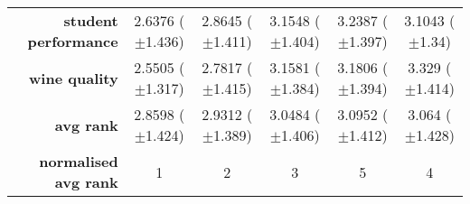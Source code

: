 \begin{table}[htbp]
{\begin{tabular}{r|ccccc}
			\textbf{student performance} & \cellcolor[rgb]{ .388,  .745,  .482}2.6376 ($\pm$1.436) & \cellcolor[rgb]{ .682,  .827,  .498}2.8645 ($\pm$1.411) & \cellcolor[rgb]{ .992,  .733,  .482}3.1548 ($\pm$1.404) & \cellcolor[rgb]{ .973,  .412,  .42}3.2387 ($\pm$1.397)  & \cellcolor[rgb]{ 1,  .922,  .518}3.1043 ($\pm$1.34)     \\
			\textbf{wine quality}        & \cellcolor[rgb]{ .388,  .745,  .482}2.5505 ($\pm$1.317) & \cellcolor[rgb]{ .62,  .812,  .494}2.7817 ($\pm$1.415)  & \cellcolor[rgb]{ 1,  .922,  .518}3.1581 ($\pm$1.384)    & \cellcolor[rgb]{ 1,  .855,  .506}3.1806 ($\pm$1.394)    & \cellcolor[rgb]{ .973,  .412,  .42}3.329 ($\pm$1.414)   \\
			\midrule
			\textbf{avg rank}            & \cellcolor[rgb]{ .388,  .745,  .482}2.8598 ($\pm$1.424) & \cellcolor[rgb]{ .62,  .812,  .494}2.9312 ($\pm$1.389)  & \cellcolor[rgb]{ 1,  .922,  .518}3.0484 ($\pm$1.406)    & \cellcolor[rgb]{ .973,  .412,  .42}3.0952 ($\pm$1.412)  & \cellcolor[rgb]{ .992,  .753,  .486}3.064 ($\pm$1.428)  \\
			\midrule
			\textbf{normalised avg rank} & \cellcolor[rgb]{ .388,  .745,  .482}1                   & \cellcolor[rgb]{ .694,  .831,  .498}2                   & \cellcolor[rgb]{ 1,  .922,  .518}3                      & \cellcolor[rgb]{ .973,  .412,  .42}5                    & \cellcolor[rgb]{ .988,  .667,  .471}4                   \\
		\end{tabular}%

	}
\end{table}%

